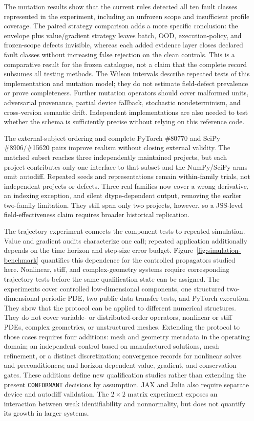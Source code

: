 \documentclass[preprint,12pt,authoryear]{elsarticle}
\begin{document}
The mutation results show that the current rules detected all ten fault classes represented in the experiment, including an unfrozen scope and insufficient profile coverage. The paired strategy comparison adds a more specific conclusion: the envelope plus value/gradient strategy leaves batch, OOD, execution-policy, and frozen-scope defects invisible, whereas each added evidence layer closes declared fault classes without increasing false rejection on the clean controls. This is a comparative result for the frozen catalogue, not a claim that the complete record subsumes all testing methods. The Wilson intervals describe repeated tests of this implementation and mutation model; they do not estimate field-defect prevalence or prove completeness. Further mutation operators should cover malformed units, adversarial provenance, partial device fallback, stochastic nondeterminism, and cross-version semantic drift. Independent implementations are also needed to test whether the schema is sufficiently precise without relying on this reference code.

The external-subject ordering and complete PyTorch \#80770 and SciPy \#8906/\#15620 pairs improve realism without closing external validity. The matched subset reaches three independently maintained projects, but each project contributes only one interface to that subset and the NumPy/SciPy arms omit autodiff. Repeated seeds and representations remain within-family trials, not independent projects or defects. Three real families now cover a wrong derivative, an indexing exception, and silent dtype-dependent output, removing the earlier two-family limitation. They still span only two projects, however, so a JSS-level field-effectiveness claim requires broader historical replication.

The trajectory experiment connects the component tests to repeated simulation.
Value and gradient audits characterize one call; repeated application additionally
depends on the time horizon and step-size error budget. Figure~\ref{fig:simulation-benchmark}
quantifies this dependence for the controlled propagators studied here. Nonlinear,
stiff, and complex-geometry systems require corresponding trajectory tests before
the same qualification state can be assigned.
The experiments cover controlled low-dimensional components, one structured two-dimensional periodic PDE, two public-data transfer tests, and PyTorch execution. They show that the protocol can be applied to different numerical structures. They do not cover variable- or distributed-order operators, nonlinear or stiff PDEs, complex geometries, or unstructured meshes. Extending the protocol to those cases requires four additions: mesh and geometry metadata in the operating domain; an independent control based on manufactured solutions, mesh refinement, or a distinct discretization; convergence records for nonlinear solves and preconditioners; and horizon-dependent value, gradient, and conservation gates. These additions define new qualification studies rather than extending the present \texttt{CONFORMANT} decisions by assumption. JAX and Julia also require separate device and autodiff validation. The $2\times2$ matrix experiment exposes an interaction between weak identifiability and nonnormality, but does not quantify its growth in larger systems.
\end{document}
